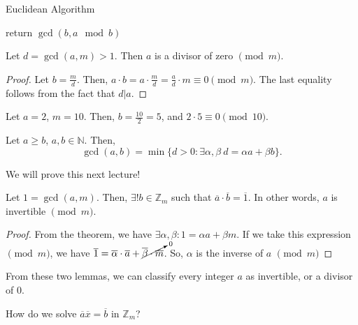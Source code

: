 \documentclass[a4paper]{article}
\begin{document}
\begin{algorithm}[H]
	\caption{Euclidean Algorithm}
	return $\gcd(b,a \mod b)$\;
\end{algorithm}

\begin{lemma}
	Let \( d=\gcd(a,m) > 1 \). Then \( a \) is a divisor of zero \( \pmod m \).
\end{lemma}

\begin{proof}
	Let \( b=\frac{m}{d} \). Then, \( a\cdot b=a\cdot \frac{m}{d}=\frac{a}{d}\cdot m \equiv 0 \pmod m \). The last equality follows from the fact that \( d|a \).
\end{proof}

\begin{eg}
	Let \( a=2 \), \( m=10 \). Then, \( b=\frac{10}{2}=5 \), and \( 2 \cdot 5 \equiv 0 \pmod {10} \).
\end{eg}

\begin{theorem}
	Let \( a\ge b \), \( a,b \in \mathbb{N} \). Then, \[
		\gcd(a,b) = \min \{d > 0 : \exists \alpha ,\beta ~ d = \alpha a + \beta b\}  
	.\] 
\end{theorem}

We will prove this next lecture!

\begin{lemma}
	Let \( 1=\gcd(a,m) \). Then, \( \exists ! b \in \mathbb{Z}_m \) such that \( \overline{a}  \cdot \overline{b} = \overline{1} \). In other words, \( a \) is invertible \( \pmod m \).
\end{lemma}

\begin{proof}
	From the theorem, we have \( \exists \alpha ,\beta : 1 = \alpha a + \beta m \). If we take this expression \( \pmod m \), we have \( \overline{1}=\overline{\alpha }\cdot \overline{a}+\cancelto{0}{\overline{\beta }\cdot \overline{m}}      \). So, \( \alpha  \) is the inverse of \( a \) \( \pmod m \)
\end{proof}

\begin{note}
	From these two lemmas, we can classify every integer \( a \) as invertible, or a divisor of 0.
\end{note}



How do we solve \( \overline{a}\overline{x}=\overline{b}    \) in \( \mathbb{Z}_m \)?
\end{document}
